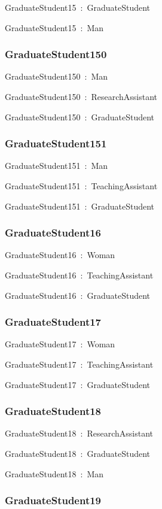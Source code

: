 \documentclass{article}
\begin{document}
GraduateStudent15~:~GraduateStudent

GraduateStudent15~:~Man

\subsubsection*{GraduateStudent150}

GraduateStudent150~:~Man

GraduateStudent150~:~ResearchAssistant

GraduateStudent150~:~GraduateStudent

\subsubsection*{GraduateStudent151}

GraduateStudent151~:~Man

GraduateStudent151~:~TeachingAssistant

GraduateStudent151~:~GraduateStudent

\subsubsection*{GraduateStudent16}

GraduateStudent16~:~Woman

GraduateStudent16~:~TeachingAssistant

GraduateStudent16~:~GraduateStudent

\subsubsection*{GraduateStudent17}

GraduateStudent17~:~Woman

GraduateStudent17~:~TeachingAssistant

GraduateStudent17~:~GraduateStudent

\subsubsection*{GraduateStudent18}

GraduateStudent18~:~ResearchAssistant

GraduateStudent18~:~GraduateStudent

GraduateStudent18~:~Man

\subsubsection*{GraduateStudent19}
\end{document}
